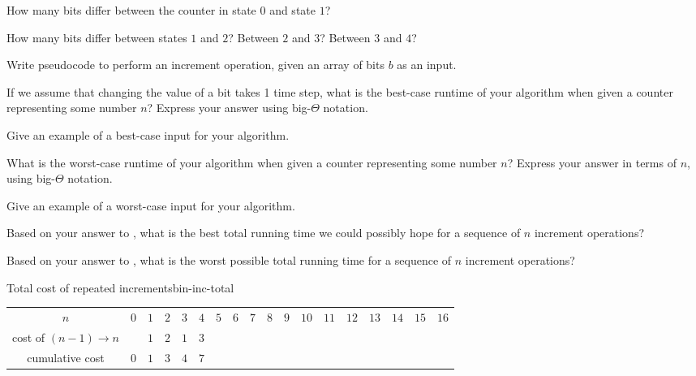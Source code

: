 \documentclass{tufte-handout}
\begin{document}
\begin{questions}
  \item How many bits differ between the counter in state $0$ and
    state $1$?
  \item How many bits differ between states $1$ and $2$?  Between $2$
    and $3$?  Between $3$ and $4$?
  \item Write pseudocode to perform an increment operation, given an
    array of bits $b$ as an input.
  \item \label{q:inc-best} If we assume that changing the value of a
    bit takes 1 time step, what is the best-case runtime of your
    algorithm when given a counter representing some number $n$?
    Express your answer using big-$\Theta$ notation.
  \item Give an example of a best-case input for your algorithm.
  \item \label{q:inc-worst} What is the worst-case runtime of your
    algorithm when given a counter representing some number $n$?
    Express your answer in terms of $n$, using big-$\Theta$
    notation.
  \item Give an example of a worst-case input for your algorithm.
  \item Based on your answer to , what is the best
    total running time we could possibly hope for a sequence of $n$
    increment operations?
  \item \label{q:worst-total} Based on your answer to
    , what is the worst possible total running time
    for a sequence of $n$ increment operations?
  \end{questions}

\pause

\begin{model*}{Total cost of repeated increments}{bin-inc-total}
  \centering
  \begin{tabular}{c|ccccccccccccccccc}
    $n$ & $0$ & $1$ & $2$ & $3$ & $4$ & $5$ & $6$ & $7$ & $8$ & $9$ & $10$
    & $11$ & $12$ & $13$ & $14$ & $15$ & $16$ \\[8pt]
    cost of $(n-1) \to n$ &  & $1$ & $2$ & $1$ & $3$ & &  &  &  &  &
    &  &  &  &  &  &  \\[8pt]
    cumulative cost & $0$ & $1$ & $3$ & $4$ & $7$ &  &  &  &
    &  &  &  &  &  &  &  &
  \end{tabular}
\end{model*}
\end{document}
